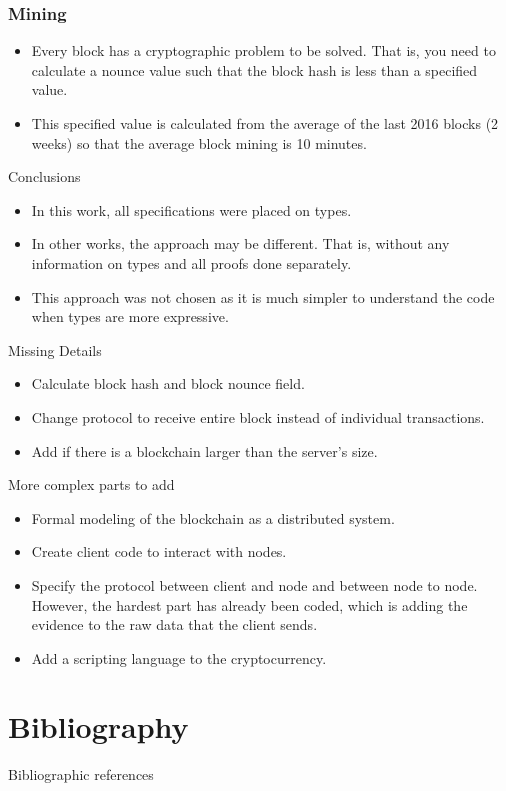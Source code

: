 \documentclass{beamer}
\begin{document}
\begin{frame}
   \frametitle{Mining}
   \begin{itemize}
     \item Every block has a cryptographic problem to be solved. That is,
       you need to calculate a nounce value such that the block hash
       is less than a specified value.
     \item This specified value is calculated from the average of the last 2016 blocks (2 weeks)
       so that the average block mining is 10 minutes.
   \end{itemize}
\end{frame}

\begin{frame}{Conclusions}
  \begin{itemize}
    \item In this work, all specifications were placed on types.
    \item In other works, the approach may be different.
      That is, without any information on types and all proofs done separately.
    \item This approach was not chosen as it is much simpler to understand the code
      when types are more expressive.
  \end{itemize}
\end{frame}

\begin{frame}{Missing Details}
  \begin{itemize}
    \item Calculate block hash and block nounce field.
    \item Change protocol to receive entire block instead of individual transactions.
    \item Add if there is a blockchain larger than the server's size.
  \end{itemize}
\end{frame}

\begin{frame}{More complex parts to add}
  \begin{itemize}
    \item Formal modeling of the blockchain as a distributed system.
    \item Create client code to interact with nodes.
    \item Specify the protocol between client and node and between node to node.
      However, the hardest part has already been coded, which is adding the evidence
      to the raw data that the client sends.
    \item Add a scripting language to the cryptocurrency.
  \end{itemize}
\end{frame}

\section{Bibliography}

\begin{frame}{Bibliographic references}
  
  
\end{frame}
\end{document}

